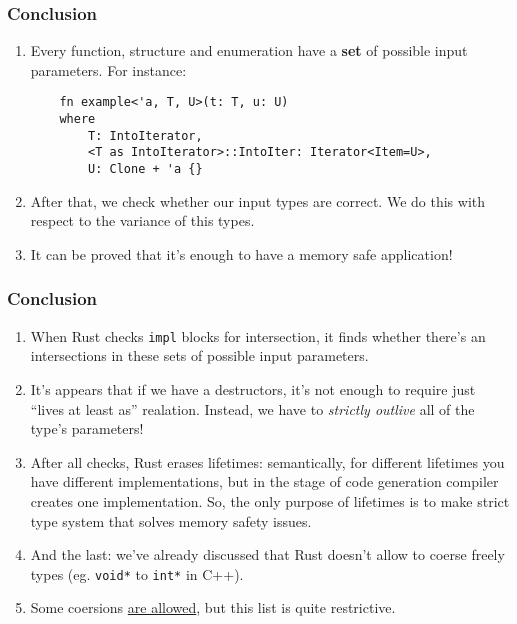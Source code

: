 \documentclass[aspectratio=1610,t]{beamer}
\begin{document}
\begin{frame}[fragile]
\frametitle{Conclusion}
\begin{enumerate}
    \item<1-> Every function, structure and enumeration have a \textbf{set} of possible input parameters. For instance:
    
    \begin{verbatim}
    fn example<'a, T, U>(t: T, u: U)
    where
        T: IntoIterator,
        <T as IntoIterator>::IntoIter: Iterator<Item=U>,
        U: Clone + 'a {}
    \end{verbatim}

    \item<2-> After that, we check whether our input types are correct. We do this with respect to the variance of this types.
    \item<3-> It can be proved that it's enough to have a memory safe application!
\end{enumerate}
\end{frame}


\begin{frame}[fragile]
\frametitle{Conclusion}
\begin{enumerate}
    \item<1-> When Rust checks \texttt{impl} blocks for intersection, it finds whether there's an intersections in these sets of possible input parameters.
    \item<2-> It's appears that if we have a destructors, it's not enough to require just ``lives at least as'' realation. Instead, we have to \textit{strictly outlive} all of the type's parameters!
    \item<3-> After all checks, Rust erases lifetimes: semantically, for different lifetimes you have different implementations, but in the stage of code generation compiler creates one implementation. So, the only purpose of lifetimes is to make strict type system that solves memory safety issues.
    \item<4-> And the last: we've already discussed that Rust doesn't allow to coerse freely types (eg. \texttt{void*} to \texttt{int*} in C++).
    \item<5-> Some coersions \href{https://doc.rust-lang.org/reference/type-coercions.html#coercion-types}{are allowed}, but this list is quite restrictive.
\end{enumerate}
\end{frame}

\end{document}

